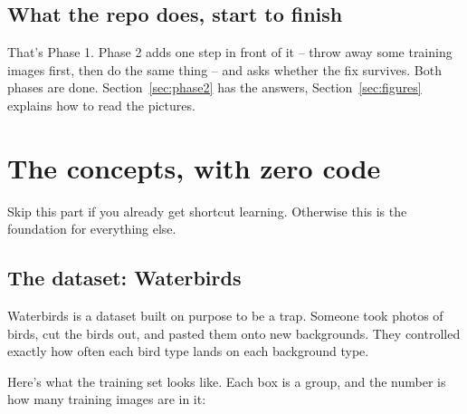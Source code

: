 \documentclass[11pt]{article}
\newcommand{\f}[1]{\textcolor{accent}{\texttt{#1}}}
\begin{document}
\subsection*{What the repo does, start to finish}

\begin{center}
\end{center}

\noindent That's Phase 1. Phase 2 adds one step in front of it -- throw away
some training images first, then do the same thing -- and asks whether the fix
survives. Both phases are done. Section~\ref{sec:phase2} has the answers,
Section~\ref{sec:figures} explains how to read the pictures.


\section{The concepts, with zero code}

Skip this part if you already get shortcut learning. Otherwise this is the
foundation for everything else.

\subsection{The dataset: Waterbirds}

Waterbirds is a dataset built on purpose to be a trap. Someone took photos of
birds, cut the birds out, and pasted them onto new backgrounds. They controlled
exactly how often each bird type lands on each background type.

Here's what the training set looks like. Each box is a group, and the number is
how many training images are in it:
\end{document}
